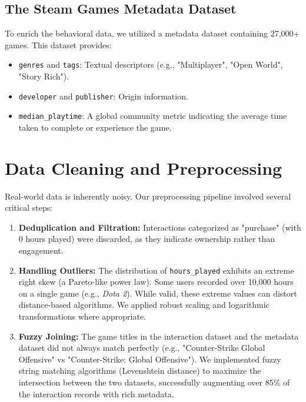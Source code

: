 \documentclass[12pt, a4paper]{report}
\begin{document}
\subsection{The Steam Games Metadata Dataset}
To enrich the behavioral data, we utilized a metadata dataset containing 27,000+ games. This dataset provides:
\begin{itemize}
    \item \texttt{genres} and \texttt{tags}: Textual descriptors (e.g., "Multiplayer", "Open World", "Story Rich").
    \item \texttt{developer} and \texttt{publisher}: Origin information.
    \item \texttt{median\_playtime}: A global community metric indicating the average time taken to complete or experience the game.
\end{itemize}

\section{Data Cleaning and Preprocessing}
Real-world data is inherently noisy. Our preprocessing pipeline involved several critical steps:
\begin{enumerate}
    \item \textbf{Deduplication and Filtration:} Interactions categorized as "purchase" (with 0 hours played) were discarded, as they indicate ownership rather than engagement.
    \item \textbf{Handling Outliers:} The distribution of \texttt{hours\_played} exhibits an extreme right skew (a Pareto-like power law). Some users recorded over 10,000 hours on a single game (e.g., \textit{Dota 2}). While valid, these extreme values can distort distance-based algorithms. We applied robust scaling and logarithmic transformations where appropriate.
    \item \textbf{Fuzzy Joining:} The game titles in the interaction dataset and the metadata dataset did not always match perfectly (e.g., "Counter-Strike Global Offensive" vs "Counter-Strike: Global Offensive"). We implemented fuzzy string matching algorithms (Levenshtein distance) to maximize the intersection between the two datasets, successfully augmenting over 85\% of the interaction records with rich metadata.
\end{enumerate}
\end{document}
